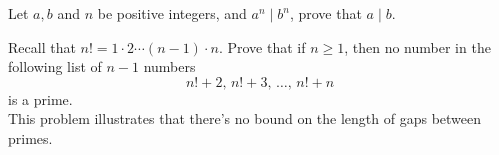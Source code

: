 \vspace*{0.1in}

\begin{problem}\label{problem 2.7}
Let $a,b$ and $n$ be positive integers, and $a^n \mid b^n$, prove that $a\mid b$.
\end{problem}

\vspace*{0.1in}

\begin{problem}\label{problem 2.8}
Recall that $n! = 1\cdot 2\cdots (n-1)\cdot n$. Prove that if $n\geq 1$, then no number in the following list of $n-1$ numbers
\[n! + 2,\, n! + 3,\,\ldots,\, n! + n\]
is a prime.\\[0.5em]
This problem illustrates that there's no bound on the length of gaps between primes.
\end{problem}


